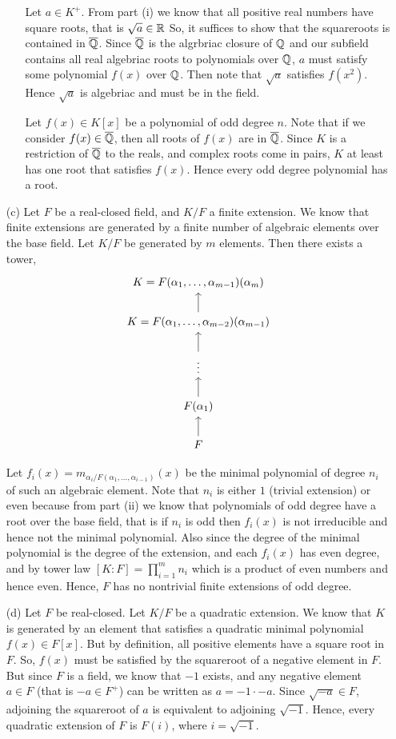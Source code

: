 \documentclass[12pt]{article}
\begin{document}
\begin{solution}
\begin{enumerate}
\begin{enumerate}
           Let $a \in K^+$.  From part (i) we know that all positive real numbers have square roots, that is $\sqrt{a} \in \R$ So, it suffices to show that the squareroots is contained in $\overline{\Q}$. Since $\overline{\Q}$ is the algrbriac closure of $\Q$ and our subfield contains all real algebriac roots to polynomials over $\Q$, $a$ must satisfy some polynomial $f(x)$ over $\Q$. Then note that $\sqrt{a}$ satisfies $f(x^2)$. Hence $\sqrt{a}$ is algebriac and must be in the field.  

            Let $f(x) \in K[x]$ be a polynomial of odd degree $n$. Note that if we consider $f(x) \in \overline{\Q}$, then all roots of $f(x)$ are in $\overline{\Q}$. Since $K$ is a restriction of $\overline{\Q}$ to the reals, and complex roots come in pairs, $K$ at least has one root that satisfies $f(x)$. Hence every odd degree polynomial has a root.
        \end{enumerate}

        \item [(c)] Let $F$ be a real-closed field, and $K/F$ a finite extension.  We know that finite extensions are generated by a finite number of algebraic elements over the base field. Let $K/F$ be generated by $m$ elements. Then there exists a tower, 
         \[
        \begin{tikzcd}
        K = F(\alpha_1, \ldots, \alpha_{m-1})(\alpha_m) \\
        K = F(\alpha_1, \ldots, \alpha_{m-2})(\alpha_{m-1}) \arrow[u] \\
        \vdots \arrow[u] \\
        F(\alpha_1) \arrow[u] \\
        F \arrow[u]
        \end{tikzcd}
        \]
        
        Let $f_i(x) = m_{\alpha_i/F(\alpha_1, \ldots, \alpha_{i-1})}(x)$ be the minimal polynomial of degree $n_i$ of such an algebraic element. Note that $n_i$ is either $1$ (trivial extension) or even because from part (ii) we know that polynomials of odd degree have a root over the base field, that is if $n_i$ is odd then $f_i(x)$ is not irreducible and hence not the minimal polynomial. Also since the degree of the minimal polynomial is the degree of the extension, and each $f_i(x)$ has even degree, and by tower law $[K:F] = \prod_{i=1}^m n_i$ which is a product of even numbers and hence even. Hence, $F$ has no nontrivial finite extensions of odd degree. 

        \item [(d)] Let $F$ be real-closed. Let $K/F$ be a quadratic extension. We know that $K$ is generated by an element that satisfies a quadratic minimal polynomial $f(x) \in F[x]$. But by definition, all positive elements have a square root in $F$. So, $f(x)$ must be satisfied by the squareroot of a negative element in $F$. But since $F$ is a field, we know that $-1$ exists, and any negative element $a \in F$ (that is $-a \in F^+$) can be written as $a = -1 \cdot -a$. Since $\sqrt{-a} \in F$, adjoining the squareroot of $a$ is equivalent to adjoining $\sqrt{-1}$. Hence, every quadratic extension of $F$ is $F(i)$, where $i = \sqrt{-1}$.
        

\end{enumerate}
\end{solution}
\end{document}
